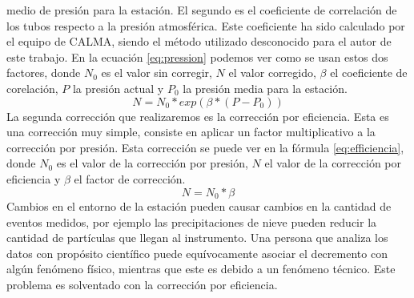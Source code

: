 		medio de presión para la estación. El segundo es el coeficiente de correlación de los tubos respecto a la presión atmosférica. Este
		coeficiente ha sido calculado por el equipo de CALMA, siendo el método utilizado desconocido para el autor de este trabajo. En la
		ecuación \ref{eq:pression} podemos ver como se usan estos dos factores, donde $N_0$ es el valor sin corregir, $N$ el valor corregido,
		$\beta$ el coeficiente de corelación, $P$ la presión actual y $P_0$ la presión media para la estación.
		\begin{equation}\label{eq:pression}
		  N=N_0*exp(\beta*(P-P_0))
		\end{equation}
		La segunda corrección que realizaremos es la corrección por eficiencia. Esta es una corrección muy simple, consiste en aplicar un
		factor multiplicativo a la corrección por presión. Esta corrección se puede ver en la fórmula \ref{eq:efficiencia}, donde $N_0$ es el
		valor de la corrección por presión, $N$ el valor de la corrección por eficiencia y $\beta$ el factor de corrección. 
		\begin{equation}\label{eq:efficiencia}
		  N=N_0*\beta
		\end{equation}
		Cambios en el entorno de la estación pueden causar cambios en la cantidad de eventos medidos, por ejemplo las precipitaciones de nieve
		pueden reducir la cantidad de partículas que llegan al instrumento. Una persona que analiza los datos con propósito científico puede
		equívocamente asociar el decremento con algún fenómeno físico, mientras que este es debido a un fenómeno técnico.  Este problema es
		solventado con la corrección por eficiencia.   
